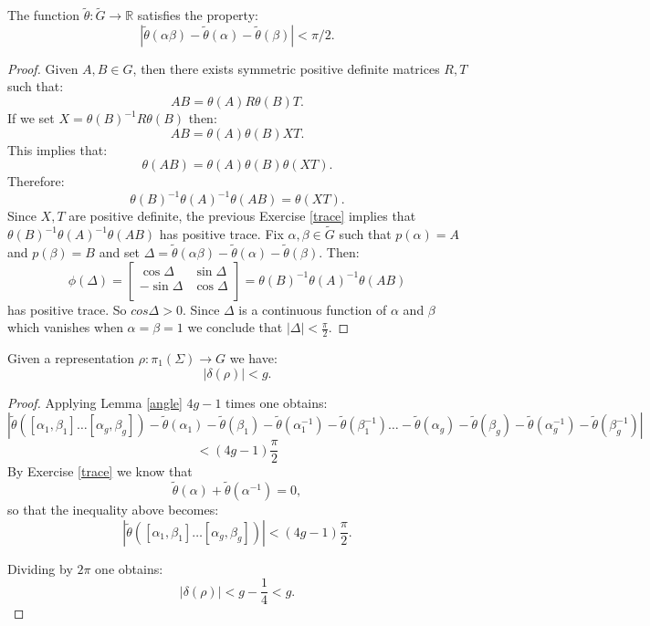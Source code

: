 \begin{lemma}\label{angle}
	The function $\tilde{\theta}: \tilde{G} \to \mathbb{R} $ satisfies the property:
	\[|\tilde{\theta}(\alpha \beta)-\tilde{\theta}(\alpha)-\tilde{\theta}(\beta)|<\pi/2.\]
\end{lemma}
\begin{proof}
	Given $A,B\in G$, then there exists symmetric positive definite matrices $R,T$ such that:  	
	\[AB=\theta(A)R \theta(B)T.\]
	If we set $X=\theta(B)^{-1}R\theta(B)$ then:
	\[AB=\theta(A)\theta(B)XT.\]
	This implies that: \[\theta(AB)=\theta(A)\theta(B)\theta(XT).\] 
	Therefore:
	\[\theta(B)^{-1}\theta(A)^{-1}\theta(AB)=\theta(XT) .\]
	Since $X,T$ are positive definite, the previous Exercise \ref{trace} implies that $\theta(B)^{-1}\theta(A)^{-1}\theta(AB)$ has positive trace.
	Fix $\alpha, \beta \in \tilde{G}$ such that $p(\alpha)=A$ and $p(\beta)=B$ and 
	set $\Delta=\tilde{\theta}(\alpha \beta)-\tilde{\theta}(\alpha)-\tilde{\theta}(\beta)$. Then:
	\[ \phi(\Delta)=\left[ {\begin{array}{cc}
		\cos \Delta & \sin \Delta \\
		-\sin \Delta & \cos \Delta \\
		\end{array} } \right]=\theta(B)^{-1}\theta(A)^{-1}\theta(AB)\]
	has positive trace. So $cos \Delta >0$. Since $\Delta$ is a continuous function of $\alpha$ and $\beta$ which vanishes when $\alpha=\beta=1$ we conclude that
	$|\Delta|<\frac{\pi}{2}$.
	
	
\end{proof}


\begin{lemma}\label{bound}
	Given a representation $\rho: \pi_1(\Sigma) \rightarrow G$ we have:
	\[ |\delta(\rho)|<g.\]
\end{lemma}

\begin{proof}
	Applying Lemma \ref{angle} $4g-1$ times one obtains:
	\[|\tilde{\theta}([\alpha_1,\beta_1]\dots [\alpha_g,\beta_g] )-\tilde{\theta}(\alpha_{1})-\tilde{\theta}(\beta_{1})-\tilde{\theta}(\alpha_{1}^{-1})-\tilde{\theta}(\beta^{-1}_1) \dots-\tilde{\theta}(\alpha_{g})-\tilde{\theta}(\beta_{g})-\tilde{\theta}(\alpha_{g}^{-1})-\tilde{\theta}(\beta^{-1}_g)  | \]
 	 \[	<(4g-1)\frac{\pi}{2}\] 
	By Exercise \ref{trace} we know that 
	\[\tilde{\theta}(\alpha)+\tilde{\theta}(\alpha^{-1})=0,\]
	so that the inequality above becomes:
	\[|\tilde{\theta}([\alpha_1,\beta_1]\dots [\alpha_g,\beta_g])  |<(4g-1)\frac{\pi}{2}.\]
	
	Dividing by $2\pi$ one obtains:
	\[ |\delta(\rho)|<g-\frac{1}{4}<g.\]
	
\end{proof}

